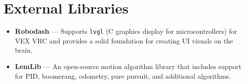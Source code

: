 \section*{External Libraries}
\begin{itemize}
    \item \textbf{Robodash} — Supports \texttt{lvgl} (C graphics display for microcontrollers) for VEX VRC and provides a solid foundation for creating UI visuals on the brain.
    \item \textbf{LemLib} — An open-source motion algorithm library that includes support for PID, boomerang, odometry, pure pursuit, and additional algorithms.
\end{itemize}
